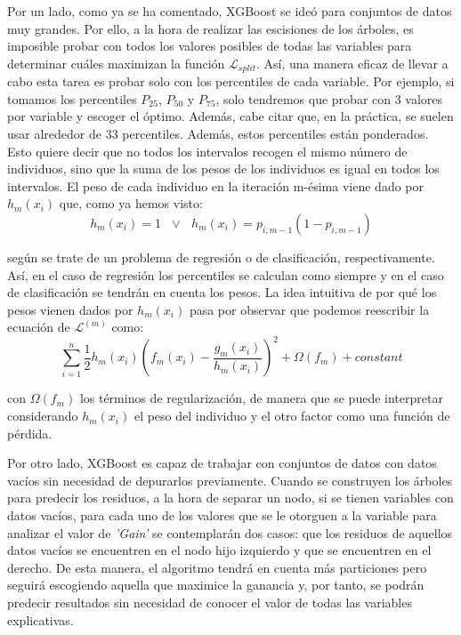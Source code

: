 \documentclass[12pt,twoside]{article}
\begin{document}
Por un lado, como ya se ha comentado, XGBoost se ideó para conjuntos de datos muy grandes. Por ello, a la hora de realizar las escisiones de los árboles, es imposible probar con todos los valores posibles de todas las variables para determinar cuáles maximizan la función $\mathcal{L}_{split}$. Así, una manera eficaz de llevar a cabo esta tarea es probar solo con los percentiles de cada variable. Por ejemplo, si tomamos los percentiles $P_{25}$, $P_{50}$ y $P_{75}$, solo tendremos que probar con 3 valores por variable y escoger el óptimo. Además, cabe citar que, en la práctica, se suelen usar alrededor de 33 percentiles. Además, estos percentiles están ponderados. Esto quiere decir que no todos los intervalos recogen el mismo número de individuos, sino que la suma de los pesos de los individuos es igual en todos los intervalos. El peso de cada individuo en la iteración m-ésima viene dado por $h_m(x_i)$ que, como ya hemos visto:
\begin{equation*}
h_m(x_i) = 1 \, \, \, \, \vee \, \, \, \, h_m(x_i) = p_{i, m-1}(1 - p_{i, m-1})
\end{equation*}

\noindent
según se trate de un problema de regresión o de clasificación, respectivamente. Así, en el caso de regresión los percentiles se calculan como siempre y en el caso de clasificación se tendrán en cuenta los pesos. La idea intuitiva de por qué los pesos vienen dados por $h_m(x_i)$ pasa por observar que podemos reescribir la ecuación de $\mathcal{L}^{(m)}$ como:
\begin{equation*}
\sum_{i = 1}^n \frac{1}{2} h_m(x_i) \left( f_m(x_i) - \frac{g_m(x_i)}{h_m(x_i)} \right)^2 + \Omega(f_m) + constant
\end{equation*}

\noindent
con $\Omega(f_m)$ los términos de regularización, de manera que se puede interpretar considerando $h_m(x_i)$ el peso del individuo y el otro factor como una función de pérdida.

Por otro lado, XGBoost es capaz de trabajar con conjuntos de datos con datos vacíos sin necesidad de depurarlos previamente. Cuando se construyen los árboles para predecir los residuos, a la hora de separar un nodo, si se tienen variables con datos vacíos, para cada uno de los valores que se le otorguen a la variable para analizar el valor de \textit{'Gain'} se contemplarán dos casos: que los residuos de aquellos datos vacíos se encuentren en el nodo hijo izquierdo y que se encuentren en el derecho. De esta manera, el algoritmo tendrá en cuenta más particiones pero seguirá escogiendo aquella que maximice la ganancia y, por tanto, se podrán predecir resultados sin necesidad de conocer el valor de todas las variables explicativas.
\end{document}
